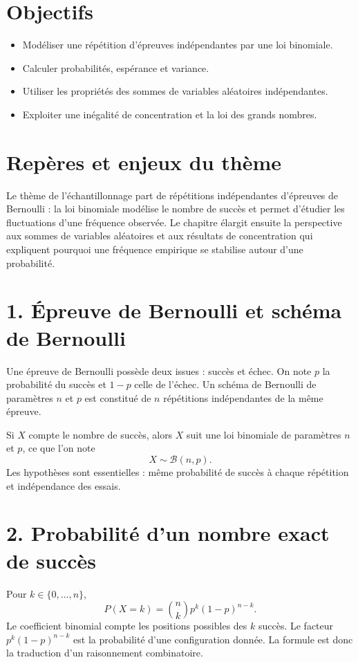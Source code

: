 
\section{Objectifs}
\begin{itemize}
\item Modéliser une répétition d’épreuves indépendantes par une loi binomiale.
\item Calculer probabilités, espérance et variance.
\item Utiliser les propriétés des sommes de variables aléatoires indépendantes.
\item Exploiter une inégalité de concentration et la loi des grands nombres.
\end{itemize}

\section{Repères et enjeux du thème}
Le thème de l’échantillonnage part de répétitions indépendantes d’épreuves de Bernoulli : la loi binomiale modélise le nombre de succès et permet d'étudier les fluctuations d'une fréquence observée. Le chapitre élargit ensuite la perspective aux sommes de variables aléatoires et aux résultats de concentration qui expliquent pourquoi une fréquence empirique se stabilise autour d’une probabilité.

\section{1. Épreuve de Bernoulli et schéma de Bernoulli}
Une épreuve de Bernoulli possède deux issues : succès et échec. On note $p$ la probabilité du succès et $1-p$ celle de l’échec. Un schéma de Bernoulli de paramètres $n$ et $p$ est constitué de $n$ répétitions indépendantes de la même épreuve.

Si $X$ compte le nombre de succès, alors $X$ suit une loi binomiale de paramètres $n$ et $p$, ce que l’on note
\[
X\sim\mathcal{B}(n,p).
\]
Les hypothèses sont essentielles : même probabilité de succès à chaque répétition et indépendance des essais.

\section{2. Probabilité d’un nombre exact de succès}
Pour $k\in\{0,\ldots,n\}$,
\[
P(X=k)=\binom nk p^k(1-p)^{n-k}.
\]
Le coefficient binomial compte les positions possibles des $k$ succès. Le facteur $p^k(1-p)^{n-k}$ est la probabilité d’une configuration donnée. La formule est donc la traduction d’un raisonnement combinatoire.

